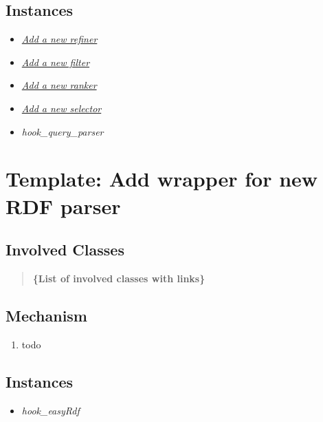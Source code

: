 \documentclass[letterpaper,10pt,english]{sphinxmanual}
\begin{document}
\subsection{Instances}
\label{docs/hooks/t_uss_components:instances}\begin{itemize}
\item {} 
{\hyperref[docs/hooks/new_refiner:hook-refiner]{\emph{Add a new refiner}}}

\item {} 
{\hyperref[docs/hooks/new_filter:hook-filter]{\emph{Add a new filter}}}

\item {} 
{\hyperref[docs/hooks/new_ranker:hook-ranker]{\emph{Add a new ranker}}}

\item {} 
{\hyperref[docs/hooks/new_selector:hook-selector]{\emph{Add a new selector}}}

\item {} 
\emph{hook\_query\_parser}

\end{itemize}


\section{Template: Add wrapper for new RDF parser}
\label{docs/hooks/t_rdf_parser:template-add-wrapper-for-new-rdf-parser}\label{docs/hooks/t_rdf_parser::doc}\label{docs/hooks/t_rdf_parser:hook-template-rdf-parser}

\subsection{Involved Classes}
\label{docs/hooks/t_rdf_parser:involved-classes}\begin{quote}

\textbf{\{List of involved classes with links\}}
\end{quote}


\subsection{Mechanism}
\label{docs/hooks/t_rdf_parser:mechanism}\begin{enumerate}
\item {} 
todo

\end{enumerate}


\subsection{Instances}
\label{docs/hooks/t_rdf_parser:instances}\begin{itemize}
\item {} 
\emph{hook\_easyRdf}

\end{itemize}
\end{document}
